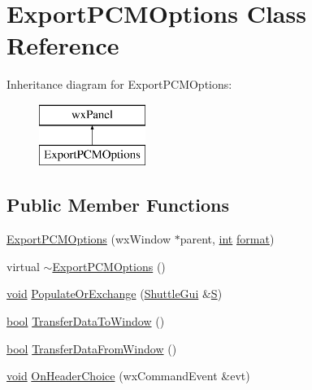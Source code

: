 \hypertarget{class_export_p_c_m_options}{}\section{Export\+P\+C\+M\+Options Class Reference}
\label{class_export_p_c_m_options}
Inheritance diagram for Export\+P\+C\+M\+Options\+:\begin{figure}[H]
\begin{center}
\leavevmode
\includegraphics[height=2.000000cm]{class_export_p_c_m_options}
\end{center}
\end{figure}
\subsection*{Public Member Functions}
\begin{DoxyCompactItemize}
\item 
\hyperlink{class_export_p_c_m_options_a1c96899ea52fb99d0b9bd3ef305db432}{Export\+P\+C\+M\+Options} (wx\+Window $\ast$parent, \hyperlink{xmltok_8h_a5a0d4a5641ce434f1d23533f2b2e6653}{int} \hyperlink{_export_p_c_m_8cpp_a317afff57d87a89158c2b038d37b2b08}{format})
\item 
virtual \hyperlink{class_export_p_c_m_options_a221b5c7a6ad10908e34c967ff8c19e30}{$\sim$\+Export\+P\+C\+M\+Options} ()
\item 
\hyperlink{sound_8c_ae35f5844602719cf66324f4de2a658b3}{void} \hyperlink{class_export_p_c_m_options_ac0a6dae38513892aaa710cb70e06b8cd}{Populate\+Or\+Exchange} (\hyperlink{class_shuttle_gui}{Shuttle\+Gui} \&\hyperlink{xlftab_8c_af933676109efed7ab34cea71d748a517}{S})
\item 
\hyperlink{mac_2config_2i386_2lib-src_2libsoxr_2soxr-config_8h_abb452686968e48b67397da5f97445f5b}{bool} \hyperlink{class_export_p_c_m_options_a634e4543a6833ae118a1d01ebbadcac2}{Transfer\+Data\+To\+Window} ()
\item 
\hyperlink{mac_2config_2i386_2lib-src_2libsoxr_2soxr-config_8h_abb452686968e48b67397da5f97445f5b}{bool} \hyperlink{class_export_p_c_m_options_ab2d151263a0d5facdf52b08a5a650df8}{Transfer\+Data\+From\+Window} ()
\item 
\hyperlink{sound_8c_ae35f5844602719cf66324f4de2a658b3}{void} \hyperlink{class_export_p_c_m_options_aed2afd61567e0ed07a4754031c98ccc4}{On\+Header\+Choice} (wx\+Command\+Event \&evt)
\end{DoxyCompactItemize}


